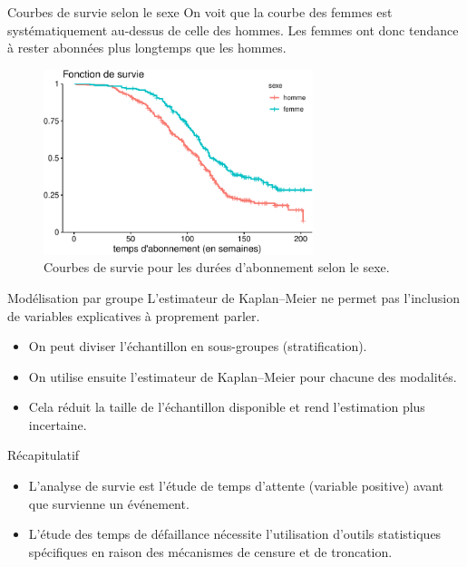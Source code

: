 \documentclass[
  ignorenonframetext,
]{beamer}
\providecommand{\tightlist}{%
  \setlength{\itemsep}{0pt}\setlength{\parskip}{0pt}}\usepackage{longtable,booktabs,array}
\begin{document}
\begin{frame}{Courbes de survie selon le sexe}
\protect\hypertarget{courbes-de-survie-selon-le-sexe}{}
On voit que la courbe des femmes est systématiquement au-dessus de celle
des hommes. Les femmes ont donc tendance à rester abonnées plus
longtemps que les hommes.

\begin{figure}

{\centering \includegraphics[width=0.7\textwidth,height=\textheight]{MATH60602-diapos9_files/figure-beamer/fig-survie-comparaison-courbes-1.pdf}

}

\caption{\label{fig-survie-comparaison-courbes}Courbes de survie pour
les durées d'abonnement selon le sexe.}

\end{figure}
\end{frame}

\begin{frame}{Modélisation par groupe}
\protect\hypertarget{moduxe9lisation-par-groupe}{}
L'estimateur de Kaplan--Meier ne permet pas l'inclusion de variables
explicatives à proprement parler.

\begin{itemize}
\tightlist
\item
  On peut diviser l'échantillon en sous-groupes (stratification).
\item
  On utilise ensuite l'estimateur de Kaplan--Meier pour chacune des
  modalités.
\item
  Cela réduit la taille de l'échantillon disponible et rend l'estimation
  plus incertaine.
\end{itemize}
\end{frame}

\begin{frame}{Récapitulatif}
\protect\hypertarget{ruxe9capitulatif}{}
\begin{itemize}
\tightlist
\item
  L'analyse de survie est l'étude de temps d'attente (variable positive)
  avant que survienne un événement.
\item
  L'étude des temps de défaillance nécessite l'utilisation d'outils
  statistiques spécifiques en raison des mécanismes de censure et de
  troncation.
\end{itemize}
\end{frame}
\end{document}
